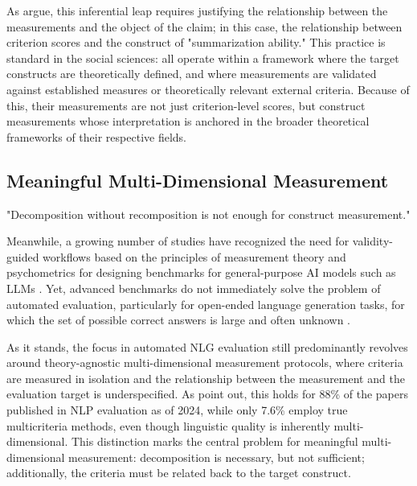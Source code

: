 As \citet{salaudeenMeasurementMeaningValidityCentered2025} argue, this inferential leap requires justifying the relationship between the measurements and the object of the claim; in this case, the relationship between criterion scores and the construct of "summarization ability." This practice is standard in the social sciences: \citet{boydLanguagebasedPersonalityNew2017, guntukuDetectingDepressionMental2017, kahnMeasuringEmotionalExpression2007, manelaNewsImpliedVolatility2017, gentzkowMeasuringGroupDifferences2019, rathjeGPTEffectiveTool2024, lemensUncoveringSemanticsConcepts2023, yangLLMMeasureGeneratingValid2024} all operate within a framework where the target constructs are theoretically defined, and where measurements are validated against established measures or theoretically relevant external criteria. Because of this, their measurements are not just criterion-level scores, but construct measurements whose interpretation is anchored in the broader theoretical frameworks of their respective fields.

\subsection{Meaningful Multi-Dimensional Measurement}

"Decomposition without recomposition is not enough for construct measurement."

Meanwhile, a growing number of studies have recognized the need for validity-guided workflows based on the principles of measurement theory and psychometrics for designing benchmarks for general-purpose AI models such as LLMs \citep{xiaoEvaluatingEvaluationMetrics2023, linPromptsConstructsDualValidity2025, binetteImprovingValidityPractical2024, beanMeasuringWhatMatters2025, salaudeenMeasurementMeaningValidityCentered2025, wangEvaluatingGeneralPurposeAI, kardanovaNovelPsychometricsBasedApproach2024, federiakinImprovingLLMLeaderboards2025, PDFModernLLM2026, feuerWhenJudgmentBecomes2025, alaaMedicalLargeLanguage2025}. Yet, advanced benchmarks do not immediately solve the problem of automated evaluation, particularly for open-ended language generation tasks, for which the set of possible correct answers is large and often unknown \citep{freitagExpertsErrorsContext2021}. 

As it stands, the focus in automated NLG evaluation still predominantly revolves around theory-agnostic multi-dimensional measurement protocols, where criteria are measured in isolation and the relationship between the measurement and the evaluation target is underspecified. As \citet{arias2025statistical} point out, this holds for 88\% of the papers published in NLP evaluation as of 2024, while only 7.6\% employ true multicriteria methods, even though linguistic quality is inherently multi-dimensional. This distinction marks the central problem for meaningful multi-dimensional measurement: decomposition is necessary, but not sufficient; additionally, the criteria must be related back to the target construct.

